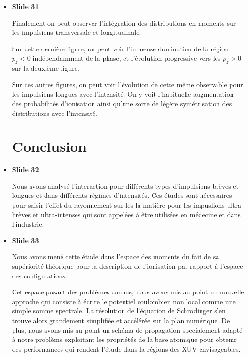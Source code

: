 \documentclass[10pt,a4paper]{article}
\begin{document}
\begin{itemize}
Sur la deuxi\`emje figure, on voit l'\'evolution de
distributions en moments avec la dur\'ee de l'impulsion.
On voit clairement la sym\'etrisation de la distribution avec 
la longueur de l'impulsion.

Sur la troisi\`eme figure, 
on voit ces distributions pour les trois r\'egimes d'ionisation.
On peut voir la diff\'erence des probabilit\'es d'ionisation 
\`a travers les amplitudes sur les l\'egendes \`a droite.

On note aussi que les raies circulaires sont une manifestation 
des spectres ATI que nous avons rencontr\'es pr\'ec\'edement.


\item \textbf{Slide 31}\par
Finalement on peut observer l'int\'egration des distributions en 
moments sur les impulsions transversale et longitudinale.

Sur cette derni\`ere figure, on peut voir l'immense domination
de la r\'egion $p_z < 0$ ind\'ependamment de la phase, et l'\'evolution 
progressive vers les $p_z > 0$ sur la deuxi\`eme figure.

Sur ces autres figures, on peut voir l'\'evolution de 
cette m\^eme observable pour les impulsions longues avec l'intensit\'e.
On y voit l'habituelle augmentation des probabilit\'es 
d'ionisation ainsi qu'une sorte de l\'eg\`ere sym\'etrisation des distributions 
avec l'intensit\'e.

\section{Conclusion}

\item \textbf{Slide 32}\par
Nous avons analys\'e l'interaction
pour diff\'erents types d'impulsions br\`eves et longues et dans 
diff\'erents r\'egimes d'intensit\'es.
Ces \'etudes sont n\'ecessaires pour 
saisir l'effet du rayonnement sur les la mati\`ere pour les impuslions 
ultra-br\`eves et ultra-intenses qui sont appel\'ees \`a \^etre utilis\'ees 
en m\'edecine et dans l'industrie.

\item \textbf{Slide 33}\par
Nous avons men\'e cette \'etude dans l'espace des moments 
du fait de sa sup\'eriorit\'e th\'eorique pour la description de 
l'ionisation par rapport \`a l'espace des configurations.

Cet espace posant des probl\`emes connus, nous avons mis au point 
un nouvelle approche qui consiste \`a \'ecrire le potentiel coulombien 
non local comme une simple somme spectrale.
La r\'esolution de l'\'equation de Schr\"odinger s'en trouve alors 
grandement simplifi\'ee et acc\'el\'er\'ee sur la plan num\'erique.
De plus, nous avons mis au point un sch\'ema de 
propagation specialement adapt\'e \`a notre probl\`eme exploitant les
propri\'et\'es de la base atomique pour obtenir des 
performances qui rendent l'\'etude dans la r\'egions des XUV envisageables.


\end{itemize}
\end{document}
